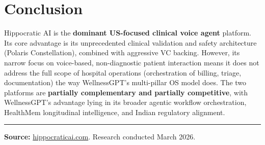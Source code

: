 \documentclass[12pt,a4paper]{article}
\begin{document}
\section{Conclusion}

Hippocratic AI is the \textbf{dominant US-focused clinical voice agent} platform. Its core advantage is its unprecedented clinical validation and safety architecture (Polaris Constellation), combined with aggressive VC backing. However, its narrow focus on voice-based, non-diagnostic patient interaction means it does not address the full scope of hospital operations (orchestration of billing, triage, documentation) the way WellnessGPT's multi-pillar OS model does. The two platforms are \textbf{partially complementary and partially competitive}, with WellnessGPT's advantage lying in its broader agentic workflow orchestration, HealthMem longitudinal intelligence, and Indian regulatory alignment.

\vspace{1cm}
\hrule\vspace{0.3cm}
\small\textbf{Source:} \href{https://hippocraticai.com}{hippocraticai.com}. Research conducted March 2026.
\end{document}
